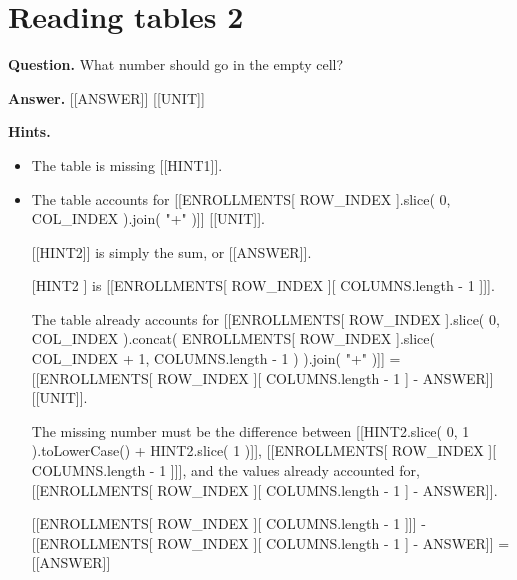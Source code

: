 \documentclass{article}
\begin{document}
\section*{Reading tables 2}
\textbf{Question.} What number should go in the empty cell?

\textbf{Answer.} [[ANSWER]] [[UNIT]]

\textbf{Hints.}
\begin{itemize}
  \item The table is missing [[HINT1]].
  \item The table accounts for [[ENROLLMENTS[ ROW\_INDEX ].slice( 0, COL\_INDEX ).join( "+" )]] [[UNIT]].
                        
                    
                    
                        [[HINT2]] is simply the sum, or [[ANSWER]].
  \item [[HINT2]] is [[ENROLLMENTS[ ROW\_INDEX ][ COLUMNS.length - 1 ]]].
                    
                
                
                    The table already accounts for [[ENROLLMENTS[ ROW\_INDEX ].slice( 0, COL\_INDEX ).concat( ENROLLMENTS[ ROW\_INDEX ].slice( COL\_INDEX + 1, COLUMNS.length - 1 ) ).join( "+" )]] =
                    [[ENROLLMENTS[ ROW\_INDEX ][ COLUMNS.length - 1 ] - ANSWER]] [[UNIT]].
                    
                
                The missing number must be the difference between [[HINT2.slice( 0, 1 ).toLowerCase() + HINT2.slice( 1 )]], [[ENROLLMENTS[ ROW\_INDEX ][ COLUMNS.length - 1 ]]], and the values already accounted for, [[ENROLLMENTS[ ROW\_INDEX ][ COLUMNS.length - 1 ] - ANSWER]].
                
                    [[ENROLLMENTS[ ROW\_INDEX ][ COLUMNS.length - 1 ]]] - [[ENROLLMENTS[ ROW\_INDEX ][ COLUMNS.length - 1 ] - ANSWER]] = [[ANSWER]]
\end{itemize}
\end{document}
